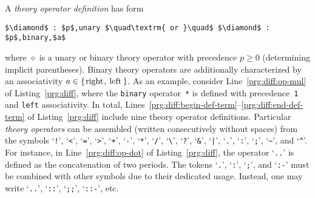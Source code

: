 A \emph{theory operator definition} has form
\begin{lstlisting}[numbers=none,mathescape=t]
$\diamond$ : $p$,unary $\quad\textrm{ or }\quad$ $\diamond$ : $p$,binary,$a$
\end{lstlisting}
where $\diamond$ is a unary or binary theory operator with precedence $p\geq 0$
(determining implicit parentheses). %
Binary theory operators are additionally characterized by an associativity
$a\in\{\text{\lstinline{right}},\linebreak[1]\text{\lstinline{left}}\}$.
%
As an example,
consider Line~\ref{prg:diff:op-mul} of Listing~\ref{prg:diff},
where the \lstinline{binary} operator~\lstinline{*} is defined with precedence~\lstinline{1} and \lstinline{left} associativity.
%
In total, Lines~\ref{prg:diff:begin-def-term}--\ref{prg:diff:end-def-term} of Listing~\ref{prg:diff}
include nine theory operator definitions.
Particular \emph{theory operators} can be assembled (written consecutively without spaces) from the symbols
`\lstinline{!}',
`\lstinline{<}',
`\lstinline{=}',
`\lstinline{>}',
`\lstinline{+}',
`\lstinline{-}',
`\lstinline{*}',
`\lstinline{/}',
`\lstinline{\}',
`\lstinline{?}',
`\lstinline{&}',
`\lstinline{|}',
`\lstinline{.}',
`\lstinline{:}',
`\lstinline{;}',
`\lstinline{~}', and
`\lstinline{^}'.
%
For instance,
in Line~\ref{prg:diff:op-dot} of Listing~\ref{prg:diff}, the operator `\lstinline{..}' is defined as the concatenation of two periods.
%
The tokens
`\lstinline{.}',
`\lstinline{:}',
`\lstinline{;}', and
`\lstinline{:-}'
must be combined with other symbols
due to their dedicated usage.
Instead, one may write
`\lstinline{..}',
`\lstinline{::}',
`\lstinline{;;}',
`\lstinline{::-}',
etc.

